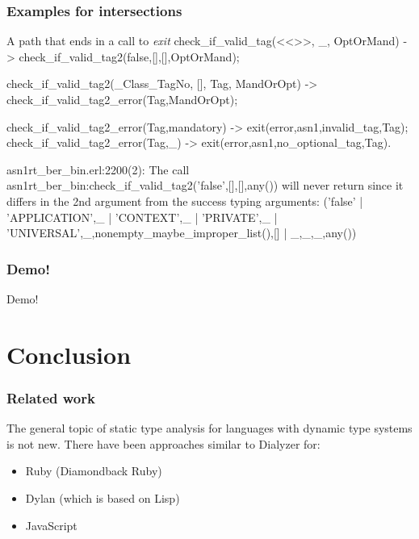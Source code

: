 \documentclass{beamer}
\begin{document}
\begin{frame}[fragile]
  \frametitle{Examples for intersections}
\begin{code}{A path that ends in a call to \emph{exit}}
check_if_valid_tag(<<>>, _, OptOrMand) ->
    check_if_valid_tag2(false,[],[],OptOrMand);

check_if_valid_tag2(_Class_TagNo, [], Tag, MandOrOpt) ->
    check_if_valid_tag2_error(Tag,MandOrOpt);

check_if_valid_tag2_error(Tag,mandatory) ->
    exit({error,{asn1,{invalid_tag,Tag}}});
check_if_valid_tag2_error(Tag,_) ->
    exit({error,{asn1,{no_optional_tag,Tag}}}).

asn1rt_ber_bin.erl:2200(2): The call
 asn1rt_ber_bin:check_if_valid_tag2('false',[],[],any())
 will never return since it differs in the 2nd argument
 from the success typing arguments: ('false' |
 {'APPLICATION',_} | {'CONTEXT',_} | {'PRIVATE',_} |
 {'UNIVERSAL',_},nonempty_maybe_improper_list(),[] |
 {_,_,_},any())
\end{code}
\end{frame}

\begin{frame}
  \frametitle{Demo!}
  \begin{center}
    Demo!
  \end{center}
\end{frame}

\section{Conclusion}

\begin{frame}
  \frametitle{Related work}
  The general topic of static type analysis for languages with dynamic
  type systems is not new. There have been approaches similar to
  Dialyzer for:
  \begin{itemize}
  \item Ruby (Diamondback Ruby)
  \item Dylan (which is based on Lisp)
  \item JavaScript
  \end{itemize}

\end{frame}
\end{document}
